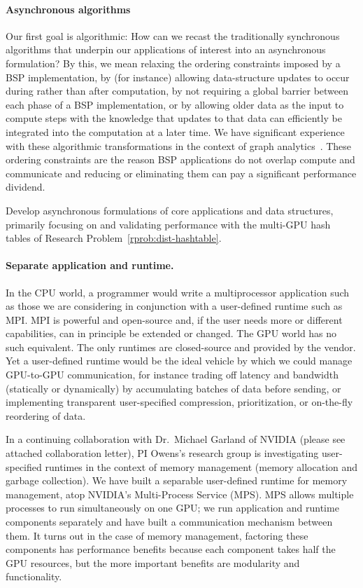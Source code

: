 \paragraph{Asynchronous algorithms}
Our first goal is algorithmic: How can we recast the traditionally synchronous algorithms that underpin our applications of interest into an asynchronous formulation? By this, we mean relaxing the ordering constraints imposed by a BSP implementation, by (for instance) allowing data-structure updates to occur during rather than after computation, by not requiring a global barrier between each phase of a BSP implementation, or by allowing older data as the input to compute steps with the knowledge that updates to that data can efficiently be integrated into the computation at a later time. We have significant experience with these algorithmic transformations in the context of graph analytics~\cite{Chen:2022:AAT,Chen:2022:SIP}. These ordering constraints are the reason BSP applications do not overlap compute and communicate and reducing or eliminating them can pay a significant performance dividend.

\begin{rproblem}
Develop asynchronous formulations of core applications and data structures, primarily focusing on and validating performance with the multi-GPU hash tables of Research Problem~\ref{rprob:dist-hashtable}.
\end{rproblem}

\paragraph{Separate application and runtime.}
In the CPU world, a programmer would write a multiprocessor application such as those we are considering in conjunction with a user-defined runtime such as MPI\@. MPI is powerful and open-source and, if the user needs more or different capabilities, can in principle be extended or changed. The GPU world has no such equivalent. The only runtimes are closed-source and provided by the vendor. Yet a user-defined runtime would be the ideal vehicle by which we could manage GPU-to-GPU communication, for instance trading off latency and bandwidth (statically or dynamically) by accumulating batches of data before sending, or implementing transparent user-specified compression, prioritization, or on-the-fly reordering of data.

In a continuing collaboration with Dr.\ Michael Garland of NVIDIA (please see attached collaboration letter), PI Owens's research group is investigating user-specified runtimes in the context of memory management (memory allocation and garbage collection). We have built  a separable user-defined runtime for memory management,  atop NVIDIA's Multi-Process Service (MPS)\@. MPS allows multiple processes to run simultaneously on one GPU\@; we run application and runtime components separately and have built a communication mechanism between them. It turns out in the case of memory management, factoring these components has  performance benefits because each component takes half the GPU resources, but the more important benefits are modularity and functionality.

